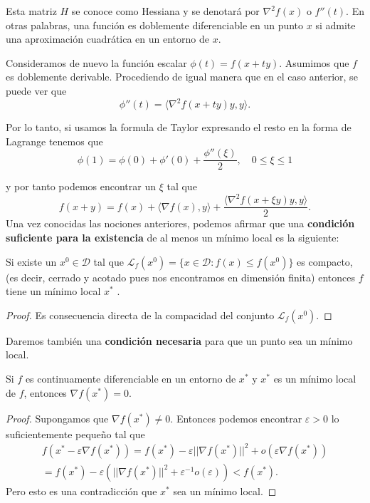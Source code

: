 Esta matriz $H$ se conoce como Hessiana y se denotará por $\nabla^2f(x)$ o $f''(t)$. En otras palabras, una función es doblemente diferenciable en un punto $x$ si admite una aproximación cuadrática en un entorno de $x$.

Consideramos de nuevo la función escalar $\phi(t)=f(x + ty)$. Asumimos que $f$ es doblemente derivable. Procediendo de igual manera que en el caso anterior, se puede ver que
\begin{equation}
    \phi''(t) = \langle \nabla^2f(x+ty)y, y\rangle.
\end{equation}

Por lo tanto, si usamos la formula de Taylor expresando el resto en la forma de Lagrange tenemos que
\begin{equation}
    \phi(1) = \phi(0) + \phi'(0) + \frac{\phi''(\xi)}{2}, \quad 0 \le \xi \le 1
\end{equation}

y por tanto podemos encontrar un $\xi$ tal que
\begin{equation}
    f(x+y) = f(x) + \langle \nabla f(x), y \rangle + \frac{\langle \nabla^2f(x + \xi y)y, y\rangle}{2}.
\end{equation}
Una vez conocidas las nociones anteriores, podemos afirmar que una \textbf{condición suficiente para la existencia} de al menos un mínimo local es la siguiente:

\begin{proposition}
    Si existe un $x^0 \in \mathcal{D}$ tal que $\mathcal{L}_f(x^0)= \{ x \in \mathcal{D}: f(x) \le f(x^0) \}$ es compacto, (es decir, cerrado y acotado pues nos encontramos en dimensión finita) entonces $f$ tiene un mínimo local $x^*$ .
\end{proposition}

\begin{proof}
    Es consecuencia directa de la compacidad del conjunto $\mathcal{L}_f(x^0)$.
\end{proof}

Daremos también una \textbf{condición necesaria} para que un punto sea un mínimo local.

\begin{theorem}\label{firstordercond}
    Si $f$ es continuamente diferenciable en un entorno de $x^*$ y $x^*$ es un mínimo local de $f$, entonces $\nabla f(x^*) = 0$.
\end{theorem}

\begin{proof}
    Supongamos que $\nabla f(x^*) \ne 0$. Entonces podemos encontrar $\varepsilon >0$ lo suficientemente pequeño tal que
    \begin{equation}
    \begin{split}
        f(x^* - \varepsilon \nabla f(x^*)) = f(x^*) - \varepsilon ||\nabla f(x^*)||^2 + o(\varepsilon \nabla f(x^*)) \\
        = f(x^*) - \varepsilon (||\nabla f(x^*)||^2 + \varepsilon^{-1} o(\varepsilon)) < f(x^*).
    \end{split}
    \end{equation}
    Pero esto es una contradicción que $x^*$ sea un mínimo local.
\end{proof}


